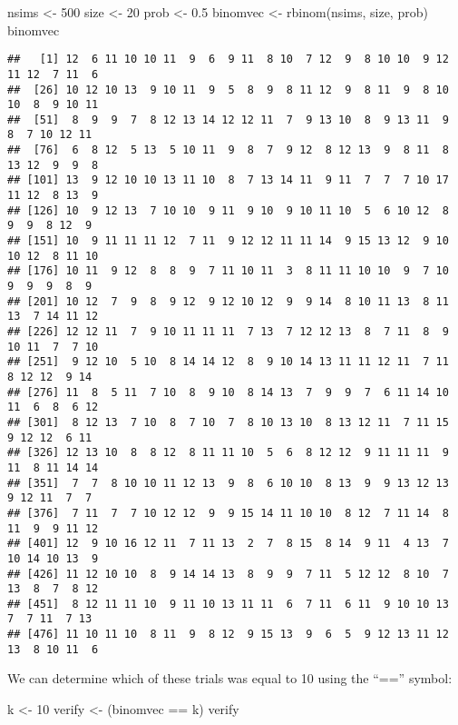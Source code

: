 \documentclass[
]{book}
\newenvironment{Shaded}{\begin{snugshade}}{\end{snugshade}}
\newcommand{\DecValTok}[1]{\textcolor[rgb]{0.00,0.00,0.81}{#1}}
\newcommand{\FloatTok}[1]{\textcolor[rgb]{0.00,0.00,0.81}{#1}}
\newcommand{\FunctionTok}[1]{\textcolor[rgb]{0.00,0.00,0.00}{#1}}
\newcommand{\NormalTok}[1]{#1}
\newcommand{\OtherTok}[1]{\textcolor[rgb]{0.56,0.35,0.01}{#1}}
\newcommand{\SpecialCharTok}[1]{\textcolor[rgb]{0.00,0.00,0.00}{#1}}
\begin{document}
\begin{Shaded}
\begin{Highlighting}[]
\NormalTok{nsims }\OtherTok{\textless{}{-}} \DecValTok{500}
\NormalTok{size }\OtherTok{\textless{}{-}} \DecValTok{20}
\NormalTok{prob }\OtherTok{\textless{}{-}} \FloatTok{0.5}
\NormalTok{binomvec }\OtherTok{\textless{}{-}} \FunctionTok{rbinom}\NormalTok{(nsims, size, prob)}
\NormalTok{binomvec}
\end{Highlighting}
\end{Shaded}

\begin{verbatim}
##   [1] 12  6 11 10 10 11  9  6  9 11  8 10  7 12  9  8 10 10  9 12 11 12  7 11  6
##  [26] 10 12 10 13  9 10 11  9  5  8  9  8 11 12  9  8 11  9  8 10 10  8  9 10 11
##  [51]  8  9  9  7  8 12 13 14 12 12 11  7  9 13 10  8  9 13 11  9  8  7 10 12 11
##  [76]  6  8 12  5 13  5 10 11  9  8  7  9 12  8 12 13  9  8 11  8 13 12  9  9  8
## [101] 13  9 12 10 10 13 11 10  8  7 13 14 11  9 11  7  7  7 10 17 11 12  8 13  9
## [126] 10  9 12 13  7 10 10  9 11  9 10  9 10 11 10  5  6 10 12  8  9  9  8 12  9
## [151] 10  9 11 11 11 12  7 11  9 12 12 11 11 14  9 15 13 12  9 10 10 12  8 11 10
## [176] 10 11  9 12  8  8  9  7 11 10 11  3  8 11 11 10 10  9  7 10  9  9  9  8  9
## [201] 10 12  7  9  8  9 12  9 12 10 12  9  9 14  8 10 11 13  8 11 13  7 14 11 12
## [226] 12 12 11  7  9 10 11 11 11  7 13  7 12 12 13  8  7 11  8  9 10 11  7  7 10
## [251]  9 12 10  5 10  8 14 14 12  8  9 10 14 13 11 11 12 11  7 11  8 12 12  9 14
## [276] 11  8  5 11  7 10  8  9 10  8 14 13  7  9  9  7  6 11 14 10 11  6  8  6 12
## [301]  8 12 13  7 10  8  7 10  7  8 10 13 10  8 13 12 11  7 11 15  9 12 12  6 11
## [326] 12 13 10  8  8 12  8 11 11 10  5  6  8 12 12  9 11 11 11  9 11  8 11 14 14
## [351]  7  7  8 10 10 11 12 13  9  8  6 10 10  8 13  9  9 13 12 13  9 12 11  7  7
## [376]  7 11  7  7 10 12 12  9  9 15 14 11 10 10  8 12  7 11 14  8 11  9  9 11 12
## [401] 12  9 10 16 12 11  7 11 13  2  7  8 15  8 14  9 11  4 13  7 10 14 10 13  9
## [426] 11 12 10 10  8  9 14 14 13  8  9  9  7 11  5 12 12  8 10  7 13  8  7  8 12
## [451]  8 12 11 11 10  9 11 10 13 11 11  6  7 11  6 11  9 10 10 13  7  7 11  7 13
## [476] 11 10 11 10  8 11  9  8 12  9 15 13  9  6  5  9 12 13 11 12 13  8 10 11  6
\end{verbatim}

We can determine which of these trials was equal to 10 using the ``=='' symbol:

\begin{Shaded}
\begin{Highlighting}[]
\NormalTok{k }\OtherTok{\textless{}{-}} \DecValTok{10}
\NormalTok{verify }\OtherTok{\textless{}{-}}\NormalTok{ (binomvec }\SpecialCharTok{==}\NormalTok{ k)}
\NormalTok{verify}
\end{Highlighting}
\end{Shaded}
\end{document}
